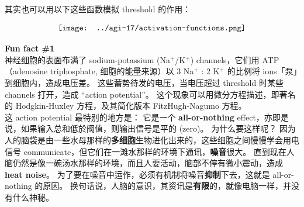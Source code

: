 \documentclass[orivec]{llncs}
\newcommand{\cc}[2]{#1}
\newcommand{\cc}[2]{#2}
\newcommand{\emp}[1]{{\color{blue}\textbf{#1}}}
\begin{document}
\cc{
其实也可以用以下这些函数模拟 threshold 的作用：
}{
These functions are also feasible candidates for the ``threshold'':
}
\begin{equation}
\vcenter{\hbox{\texttt{[image: ../agi-17/activation-functions.png]}}}
\end{equation}

\begin{tcolorbox}[colback=lightyellow, breakable, enhanced]
\emp{Fun fact \#1}\\

\cc{
神经细胞的表面布满了 sodium-potassium (Na$^+$/K$^+$) channels，它们用 ATP （adenosine triphosphate, 细胞的能量来源）以 3 Na$^+$ : 2 K$^+$ 的比例将 ions「泵」到细胞内，造成电压差。 这些蓄势待发的电压，当电压超过 threshold 时某些 channels 打开，造成 ``action potential''。 这个现象可以用微分方程描述，即著名的 Hodgkin-Huxley 方程，及其简化版本 FitzHugh-Nagumo 方程。\\

这 action potential 最特别的地方是： 它是一个 \emp{all-or-nothing} effect，亦即是说，如果输入总和低於阀值，则输出信号是平的 (zero)。 为什么要这样呢？  因为人的脑袋是由一些水母那样的\emp{多细胞}生物进化出来的，这些细胞之间慢慢学会用电信号 communicate，但它们在一滩水那样的环境下通讯，\emp{噪音}很大。 直到现在人脑仍然是像一碗汤水那样的环境，而且人要活动，脑部不停有微小震动，造成\emp{heat noise}。 为了要在噪音中运作，必须有机制将噪音\emp{抑制}下去，这就是 all-or-nothing 的原因。 换句话说，人脑的意识，其资讯是\emp{有限}的，就像电脑一样，并没有什么神秘。
}{
The surface of the neuron is covered with sodium-potassium (Na$^+$/K$^+$) channels, that use ATP (adenosine triphosphate, the energy source in the cell) to ``pump'' ions into the cell with a 3 Na$^+$ : 2 K$^+$ ratio, creating a voltage difference.   When the voltage exceeds the threshold, certain ion channels open, the built-up voltage is released to create an ``action potential''.  This phenomenon can be described using differential equations, that is the famous \textbf{Hodgkin-Huxley} equation, and its simplified version, the \textbf{FitzHugh-Nagumo} equation.\\

A very special feature about the action potential is that it is ``\textbf{all-or-nothing}'', ie, if the input is below threshold, the output signal would be flat (zero).  Why is it like this?  That is because the human brain evolved from primitive \textbf{multi-cellular} organisms (like the jellyfish) whose cells gradually learned to use electric signals to communicate.  They operated in an environment like a pool of water, in which there is a lot of \textbf{noise}.  Even now the human brain is like a pool of liquid, and the body is in constant motion, resulting in \textbf{heat noise}.  In order to operate within such noise, there must be a mechanism to \textbf{suppress} the noise;  This is the reason for all-or-nothing.  That is to say, human consciousness has \textbf{finite} information content, similar to a digital computer, and is not mysterious.
}
\end{tcolorbox}
\end{document}
